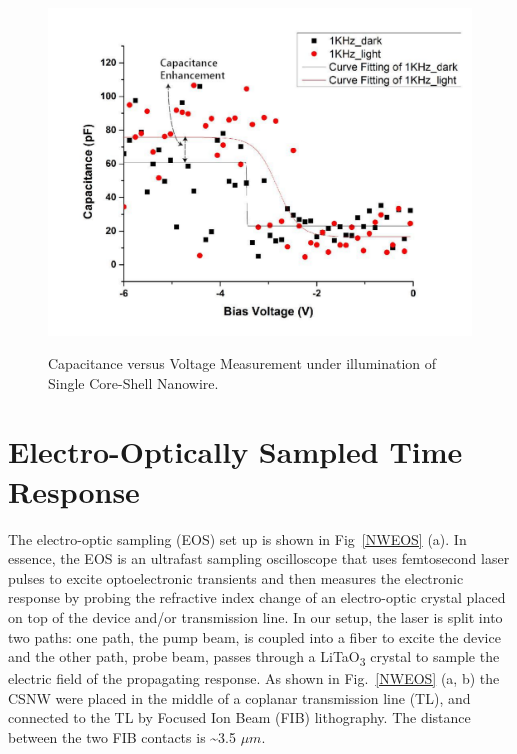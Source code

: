 \begin{figure}
  \caption{Capacitance versus Voltage Measurement under illumination of Single Core-Shell Nanowire.}
  \centering
  \includegraphics[width=\textwidth]{pictures/Data/CSNWCVlight}
  \label{CSNWCVlight}
\end{figure}

\section{Electro-Optically Sampled Time Response}

The electro-optic sampling (EOS) set up is shown in Fig~\ref{NWEOS} (a). In
essence, the EOS is an ultrafast sampling oscilloscope that uses femtosecond
laser pulses to excite optoelectronic transients and then measures the
electronic response by probing the refractive index change of an electro-optic
crystal placed on top of the device and/or transmission line. In our setup, the
laser is split into two paths: one path, the pump beam, is coupled into a fiber
to excite the device and the other path, probe beam, passes through a
LiTaO\textsubscript{3} crystal to sample the electric field of the propagating
response. As shown in Fig.~\ref{NWEOS} (a, b) the CSNW were placed in the
middle of a coplanar transmission line (TL), and connected to the TL by Focused
Ion Beam (FIB) lithography. The distance between the two FIB contacts is
\textasciitilde{}3.5 $\mu{m}$.

